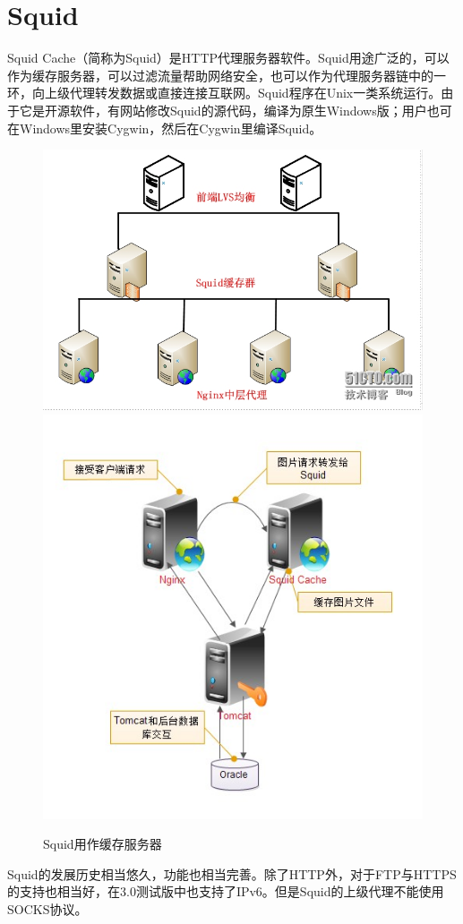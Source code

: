 
\section{Squid}

Squid Cache（简称为Squid）是HTTP代理服务器软件。Squid用途广泛的，可以作为缓存服务器，可以过滤流量帮助网络安全，也可以作为代理服务器链中的一环，向上级代理转发数据或直接连接互联网。Squid程序在Unix一类系统运行。由于它是开源软件，有网站修改Squid的源代码，编译为原生Windows版；用户也可在Windows里安装Cygwin，然后在Cygwin里编译Squid。
\begin{figure}[ht]
	\begin{center}
		\includegraphics[keepaspectratio,width=0.3\paperwidth]{Pictures/Network/LvsPlusSquidPlusNginx.jpg}
		\includegraphics[keepaspectratio,width=0.3\paperwidth]{Pictures/Network/Nginx2Squid2Tomcat.jpg}
	\caption{Squid用作缓存服务器}
	\label{fig:LvsPlusSquidPlusNginx}
	\end{center}
\end{figure}


Squid的发展历史相当悠久，功能也相当完善。除了HTTP外，对于FTP与HTTPS的支持也相当好，在3.0测试版中也支持了IPv6。但是Squid的上级代理不能使用SOCKS协议。




\clearpage



